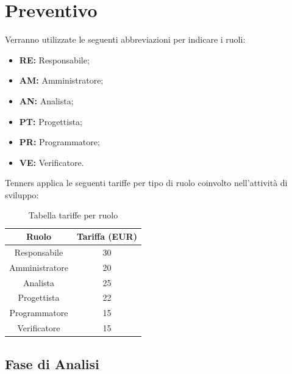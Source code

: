 \section{Preventivo}
Verranno utilizzate le seguenti abbreviazioni per indicare i ruoli:
\begin{itemize}
	\item \textbf{RE:} Responsabile;
	\item \textbf{AM:} Amministratore;
	\item \textbf{AN:} Analista;
	\item \textbf{PT:} Progettista;
	\item \textbf{PR:} Programmatore;
	\item \textbf{VE:} Verificatore.
\end{itemize}
Tenners applica le seguenti tariffe per tipo di ruolo coinvolto nell'attività di sviluppo:\\
\begin{table}[h]
\caption{Tabella tariffe per ruolo}            
\begin{center}
\begin{tabular}{ |c|c|  }
 \hline
 Ruolo 		& Tariffa (EUR)\\
 \hline\hline
	Responsabile	& 30\\
	Amministratore	& 20\\
	Analista		& 25\\
	Progettista		& 22\\
	Programmatore	& 15\\
	Verificatore	& 15\\
 \hline
\end{tabular}
\end{center}
\end{table}
\newpage
\subsection{Fase di Analisi}
